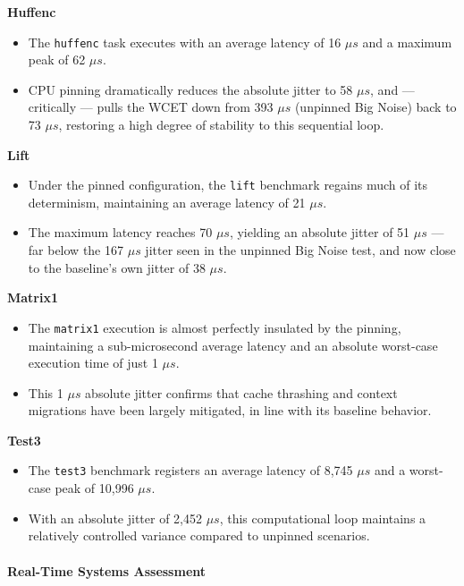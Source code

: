 \textbf{Huffenc}

\begin{itemize}
\item
  The \texttt{huffenc} task executes with an average latency of 16 $\mu s$
  and a maximum peak of 62 $\mu s$.
\item
  CPU pinning dramatically reduces the absolute jitter to 58 $\mu s$, and ---
  critically --- pulls the WCET down from 393 $\mu s$ (unpinned Big Noise)
  back to 73 $\mu s$, restoring a high degree of stability to this sequential
  loop.
\end{itemize}

\textbf{Lift}

\begin{itemize}
\item
  Under the pinned configuration, the \texttt{lift} benchmark regains
  much of its determinism, maintaining an average latency of 21 $\mu s$.
\item
  The maximum latency reaches 70 $\mu s$, yielding an absolute jitter of 51
  $\mu s$ --- far below the 167 $\mu s$ jitter seen in the unpinned Big Noise
  test, and now close to the baseline's own jitter of 38 $\mu s$.
\end{itemize}

\textbf{Matrix1}

\begin{itemize}
\item
  The \texttt{matrix1} execution is almost perfectly insulated by the
  pinning, maintaining a sub-microsecond average latency and an absolute
  worst-case execution time of just 1 $\mu s$.
\item
  This 1 $\mu s$ absolute jitter confirms that cache thrashing and context
  migrations have been largely mitigated, in line with its baseline
  behavior.
\end{itemize}

\textbf{Test3}

\begin{itemize}
\item
  The \texttt{test3} benchmark registers an average latency of 8,745 $\mu s$
  and a worst-case peak of 10,996 $\mu s$.
\item
  With an absolute jitter of 2,452 $\mu s$, this computational loop maintains
  a relatively controlled variance compared to unpinned scenarios.
\end{itemize}

\paragraph{Real-Time Systems
Assessment}\label{real-time-systems-assessment-3}

